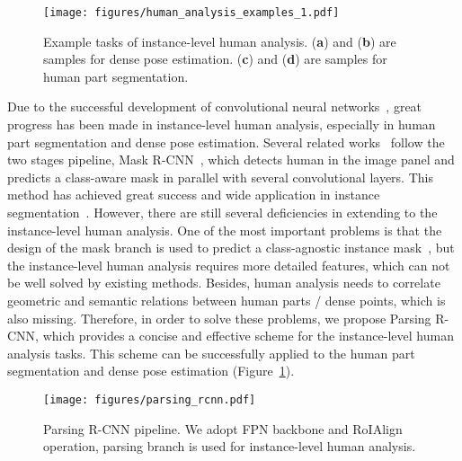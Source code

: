 \documentclass[10pt,twocolumn,letterpaper]{article}
\begin{document}
\begin{figure}[t]
\begin{center}
\texttt{[image: figures/human\_analysis\_examples\_1.pdf]}
\end{center}
\caption{Example tasks of instance-level human analysis. (\textbf{a}) and (\textbf{b}) are samples for dense pose estimation. (\textbf{c}) and (\textbf{d}) are samples for human part segmentation.}
\label{fig:instance_level_human_analysis}
\end{figure}

Due to the successful development of convolutional neural networks~\cite{Alex_nip2012_alexnet, Girshick_cvpr2014_rcnn, Long_cvpr2015_fcn, Szegedy_cvpr2016_inception-v3, He_iccv2017_maskrcnn, Wu_eccv2018_gn}, great progress has been made in instance-level human analysis, especially in human part segmentation and dense pose estimation. Several related works~\cite{Liang_tpami2018_lip, Zhao_mm2018_mhpv2} follow the two stages pipeline, Mask R-CNN~\cite{He_iccv2017_maskrcnn}, which detects human in the image panel and predicts a class-aware mask in parallel with several convolutional layers. This method has achieved great success and wide application in instance segmentation~\cite{Dai_cvpr2016_mnc, Dai_cvpr2017_fcis, He_iccv2017_maskrcnn, Liu_cvpr2018_panet}. However, there are still several deficiencies in extending to the instance-level human analysis. One of the most important problems is that the design of the mask branch is used to predict a class-agnostic instance mask~\cite{He_iccv2017_maskrcnn}, but the instance-level human analysis requires more detailed features, which can not be well solved by existing methods. Besides, human analysis needs to correlate geometric and semantic relations between human parts / dense points, which is also missing. Therefore, in order to solve these problems, we propose Parsing R-CNN, which provides a concise and effective scheme for the instance-level human analysis tasks. This scheme can be successfully applied to the human part segmentation and dense pose estimation (Figure~\ref{fig:instance_level_human_analysis}). 

\begin{figure*}
\begin{center}
\texttt{[image: figures/parsing\_rcnn.pdf]}
\end{center}
\vspace{-1mm}
\caption{Parsing R-CNN pipeline. We adopt FPN backbone and RoIAlign operation, parsing branch is used for instance-level human analysis.}
\label{fig:parsing_rcnn_pipline}
\end{figure*}
\end{document}
